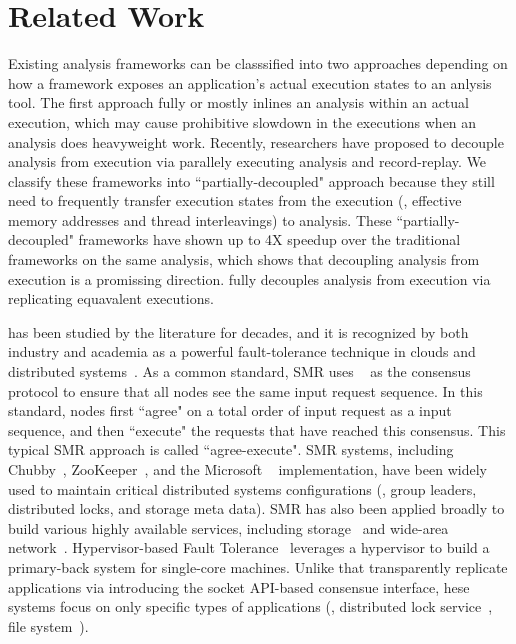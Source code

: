 \section{Related Work} \label{sec:related}

Existing analysis frameworks can be classsified into two approaches depending 
on how a framework exposes an application's actual execution states to an 
anlysis tool. The first approach fully or mostly inlines an analysis within an 
actual execution, which may cause prohibitive slowdown in the executions when 
an analysis does heavyweight work. Recently, researchers have proposed to 
decouple analysis from execution via parallely executing analysis and 
record-replay. We classify these frameworks into ``partially-decoupled" 
approach because they still need to frequently transfer execution states from 
the execution (\eg, effective memory addresses and thread interleavings) to 
analysis. These ``partially-decoupled" frameworks have shown up to 4X speedup 
over the traditional frameworks on the same analysis, which shows that 
decoupling analysis from execution is a promissing direction. \xxx fully 
decouples analysis from execution via replicating equavalent executions.

\smr has been studied by the literature for decades, and it is recognized by 
both industry and academia as a powerful fault-tolerance technique in clouds 
and distributed systems~\cite{lamportclock, smr:tutorial}. As a common 
standard, SMR uses \paxos~\cite{paxos} as the consensus protocol to ensure that 
all nodes see the same input request sequence. In this standard, nodes first 
``agree" on a total order of input request as a input sequence, and then 
``execute" the requests that have reached this consensus. This typical SMR 
approach is called ``agree-execute". SMR systems, including 
Chubby~\cite{chubby:osdi}, ZooKeeper~\cite{zookeeper}, and 
the Microsoft \paxos~\cite{paxos} implementation, have been widely used to 
maintain critical distributed systems configurations (\eg, group leaders, 
distributed locks, and storage meta data). SMR has also been applied broadly to 
build various highly available services, including 
storage~\cite{paxos:datastore} and wide-area network~\cite{mencius:osdi08}. 
Hypervisor-based Fault Tolerance~\cite{hft:sosp95} leverages a hypervisor to 
build a primary-back system for single-core machines. Unlike \xxx that 
transparently replicate applications via introducing the socket API-based 
consensue interface, hese systems focus on only specific types of applications 
(\eg, distributed lock service~\cite{chubby:osdi}, file 
system~\cite{zookeeper}).